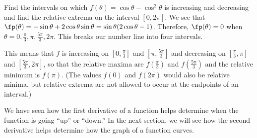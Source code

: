 \begin{example}\label{inc_dec_trig}
Find the intervals on which $f(\theta)=\cos\theta-\cos^2\theta$ is increasing and decreasing and find the relative extrema on the interval $[0,2\pi]$.
\solution
We see that $\fp(\theta)=-\sin\theta+2\cos\theta\sin\theta=\sin\theta(2\cos\theta-1)$.  Therefore, $\fp(\theta)=0$ when $\theta=0,\frac\pi3,\pi,\frac{5\pi}3,2\pi$.  This breaks our number line into four intervals.

\iflatexml{}

\begin{center}
\end{center}

This means that $f$ is increasing on $[0,\frac\pi3]$ and $[\pi,\frac{5\pi}3]$ and decreasing on $[\frac\pi3,\pi]$ and $[\frac{5\pi}3,2\pi]$, so that the relative maxima are $f(\frac\pi3)$ and $f(\frac{5\pi}3)$ and the relative minimum is $f(\pi)$.  (The values $f(0)$ and $f(2\pi)$ would also be relative minima, but relative extrema are not allowed to occur at the endpoints of an interval.)
\end{example}

We have seen how the first derivative of a function helps determine when the function is going ``up'' or ``down.'' In the next section, we will see how the second derivative helps determine how the graph of a function curves.


